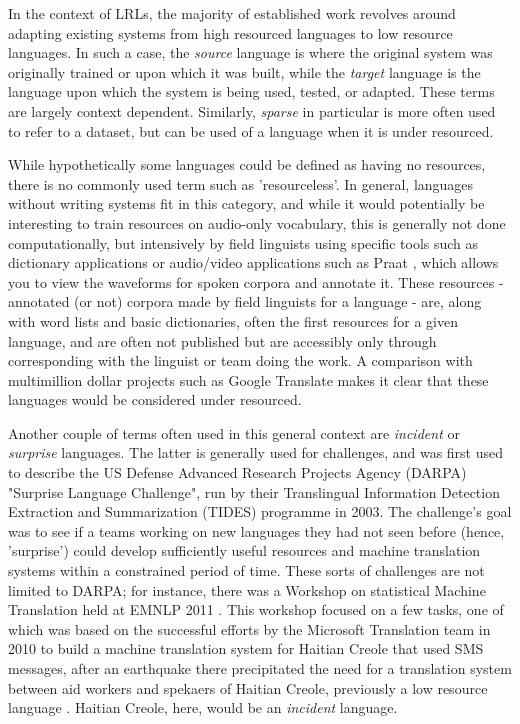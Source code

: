In the context of LRLs, the majority of established work revolves around adapting existing systems from high resourced languages to low resource languages. In such a case, the \textit{source} language is where the original system was originally trained or upon which it was built, while the \textit{target} language is the language upon which the system is being used, tested, or adapted. These terms are largely context dependent. Similarly, \textit{sparse} in particular is more often used to refer to a dataset, but can be used of a language when it is under resourced.

While hypothetically some languages could be defined as having no resources, there is no commonly used term such as 'resourceless'. In general, languages without writing systems fit in this category, and while it would potentially be interesting to train resources on audio-only vocabulary, this is generally not done computationally, but intensively by field linguists using specific tools such as dictionary applications or audio/video applications such as Praat \citep{boersma2009praat}, which allows you to view the waveforms for spoken corpora and annotate it. These resources - annotated (or not) corpora made by field linguists for a language - are, along with word lists and basic dictionaries, often the first resources for a given language, and are often not published but are accessibly only through corresponding with the linguist or team doing the work. A comparison with multimillion dollar projects such as Google Translate makes it clear that these languages would be considered under resourced.

Another couple of terms often used in this general context are \textit{incident} or \textit{surprise} languages. The latter is generally used for challenges, and was first used to describe the US Defense Advanced Research Projects Agency (DARPA) "Surprise Language Challenge", run by their Translingual Information Detection Extraction and Summarization (TIDES) programme in 2003. The challenge's goal was to see if a teams working on new languages they had not seen before (hence, 'surprise') could develop sufficiently useful resources and machine translation systems within a constrained period of time. \citep{oard2003surprise} These sorts of challenges are not limited to DARPA; for instance, there was a Workshop on statistical Machine Translation held at EMNLP 2011 \citep{callison2011findings}. This workshop focused on a few tasks, one of which was based on the successful efforts by the Microsoft Translation team in 2010 to build a machine translation system for Haitian Creole that used SMS messages, after an earthquake there precipitated the need for a translation system between aid workers and spekaers of Haitian Creole, previously a low resource language \citep{lewis2010haitian, lewis2011crisis}. Haitian Creole, here, would be an \textit{incident} language.


